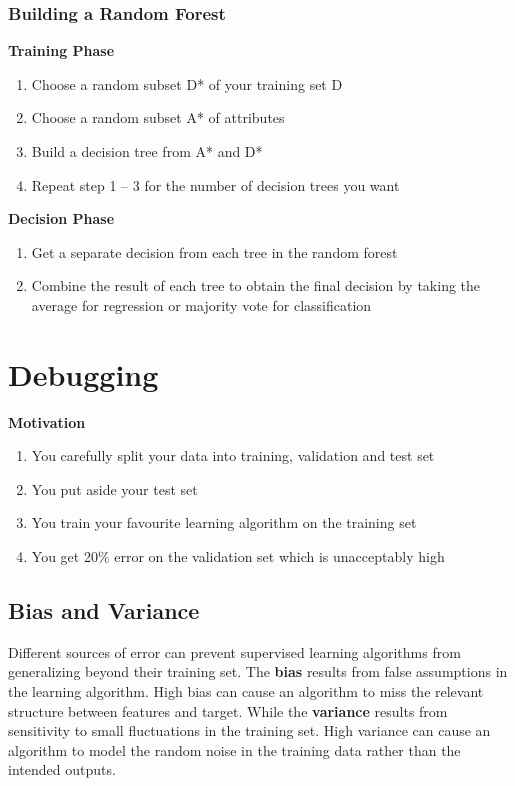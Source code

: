 \documentclass[11pt]{article}
\begin{document}
\subsubsection{Building a Random Forest}

\textbf{Training Phase}
\begin{enumerate}
    \item Choose a random subset D* of your training set D
    \item Choose a random subset A* of attributes
    \item Build a decision tree from A* and D*
    \item Repeat step 1 – 3 for the number of decision trees you want
\end{enumerate}
\noindent
\textbf{Decision Phase}
\begin{enumerate}
    \item Get a separate decision from each tree in the random forest
    \item Combine the result of each tree to obtain the final decision by taking the average for regression or majority vote for classification
\end{enumerate}

\section{Debugging}

\textbf{Motivation}
\begin{enumerate}
    \item You carefully split your data into training, validation and test set
    \item You put aside your test set
    \item You train your favourite learning algorithm on the training set
    \item You get 20\% error on the validation set which is unacceptably high
\end{enumerate}

\subsection{Bias and Variance}
Different sources of error can prevent supervised learning algorithms from generalizing beyond their training set. The \textbf{bias} results from false assumptions in the learning algorithm. High bias can cause an algorithm to miss the relevant structure between features and target. While the \textbf{variance} results from sensitivity to small fluctuations in the training set. High variance can cause an algorithm to model the random noise in the training data rather than the intended outputs.
\end{document}
